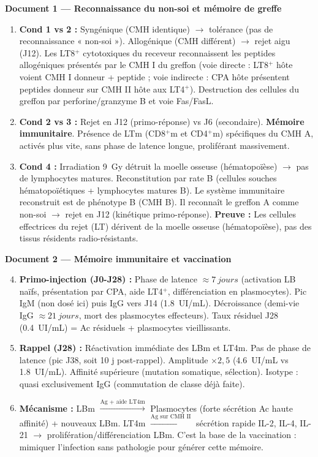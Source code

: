 \documentclass[11pt]{article}
\newcounter{popsec}
\newcounter{popsub}
\newcommand{\courssub}[1]{%
  \stepcounter{popsub}%
  \par\vspace{9pt}\noindent{\popxbold\fontsize{11.5}{13}\selectfont\color{popink}{\color{poporange}\thepopsec.\thepopsub}\hspace{6pt}#1}\par\nopagebreak\vspace{4pt}
}
\begin{document}
\courssub{Démarche et corrigé commenté}
\begin{exoresolu}
\textbf{Document 1 — Reconnaissance du non-soi et mémoire de greffe}
\begin{enumerate}
    \item \textbf{Cond 1 vs 2 :} Syngénique (CMH identique) $\rightarrow$ tolérance (pas de reconnaissance « non-soi »). Allogénique (CMH différent) $\rightarrow$ rejet aigu (J12). Les LT8$^+$ cytotoxiques du receveur reconnaissent les peptides allogéniques présentés par le CMH I du greffon (voie directe : LT8$^+$ hôte voient CMH I donneur + peptide ; voie indirecte : CPA hôte présentent peptides donneur sur CMH II hôte aux LT4$^+$). Destruction des cellules du greffon par perforine/granzyme B et voie Fas/FasL.
    \item \textbf{Cond 2 vs 3 :} Rejet en J12 (primo-réponse) vs J6 (secondaire). \textbf{Mémoire immunitaire}. Présence de LTm (CD8$^+$m et CD4$^+$m) spécifiques du CMH A, activés plus vite, sans phase de latence longue, proliférant massivement.
    \item \textbf{Cond 4 :} Irradiation \SI{9}{Gy} détruit la moelle osseuse (hématopoïèse) $\rightarrow$ pas de lymphocytes matures. Reconstitution par rate B (cellules souches hématopoïétiques + lymphocytes matures B). Le système immunitaire reconstruit est de phénotype B (CMH B). Il reconnaît le greffon A comme non-soi $\rightarrow$ rejet en J12 (kinétique primo-réponse). \textbf{Preuve :} Les cellules effectrices du rejet (LT) dérivent de la moelle osseuse (hématopoïèse), pas des tissus résidents radio-résistants.
\end{enumerate}

\textbf{Document 2 — Mémoire immunitaire et vaccination}
\begin{enumerate}
    \setcounter{enumi}{3}
    \item \textbf{Primo-injection (J0-J28) :} Phase de latence $\approx \SI{7}{jours}$ (activation LB naïfs, présentation par CPA, aide LT4$^+$, différenciation en plasmocytes). Pic IgM (non dosé ici) puis IgG vers J14 (\SI{1,8}{UI/mL}). Décroissance (demi-vie IgG $\approx \SI{21}{jours}$, mort des plasmocytes effecteurs). Taux résiduel J28 (\SI{0,4}{UI/mL}) = Ac résiduels + plasmocytes vieillissants.
    \item \textbf{Rappel (J28) :} Réactivation immédiate des LBm et LT4m. Pas de phase de latence (pic J38, soit 10 j post-rappel). Amplitude $\times 2,5$ (\SI{4,6}{UI/mL} vs \SI{1,8}{UI/mL}). Affinité supérieure (mutation somatique, sélection). Isotype : quasi exclusivement IgG (commutation de classe déjà faite).
    \item \textbf{Mécanisme :} LBm $\xrightarrow{\text{Ag + aide LT4m}}$ Plasmocytes (forte sécrétion Ac haute affinité) + nouveaux LBm. LT4m $\xrightarrow{\text{Ag sur CMH II}}$ sécrétion rapide IL-2, IL-4, IL-21 $\rightarrow$ prolifération/différenciation LBm. C'est la base de la vaccination : mimiquer l'infection sans pathologie pour générer cette mémoire.
\end{enumerate}


\end{exoresolu}
\end{document}
